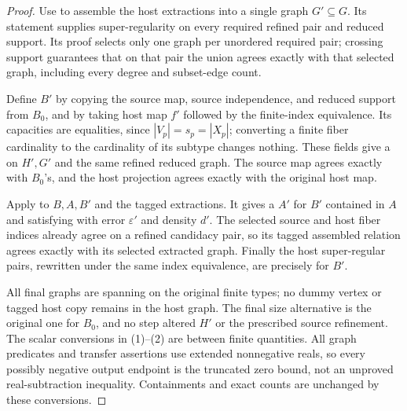 \begin{proof}
Use  to assemble the host
extractions into a single graph $G'\subseteq G$. Its statement
supplies super-regularity on every required refined pair and reduced
support. Its proof selects only one graph per unordered required
pair; crossing support guarantees that on that pair the union
agrees exactly with that selected graph, including every degree
and subset-edge count.

Define $B'$ by copying the source map, source independence, and
reduced support from $B_0$, and by taking host map $f'$ followed by
the finite-index equivalence. Its capacities are equalities, since
$|V_p|=s_p=|X_p|$; converting a finite fiber cardinality to the
cardinality of its subtype changes nothing. These fields give
a  on $H',G'$ and the same refined reduced
graph. The source map agrees exactly with $B_0$'s, and the
host projection agrees exactly with the original host map.

Apply  to $B,A,B'$ and the
tagged extractions. It gives a  $A'$
for $B'$ contained in $A$ and satisfying
 with error $\varepsilon'$ and
density $d'$. The selected source and host fiber indices already
agree on a refined candidacy pair, so its tagged assembled relation
agrees exactly with its selected extracted graph.
Finally the host super-regular pairs, rewritten under the same
index equivalence, are precisely
 for $B'$.

All final graphs are spanning on the original finite types;
no dummy vertex or tagged host copy remains in the host graph.
The final size alternative is the original one for $B_0$,
and no step altered $H'$ or the prescribed source refinement.
The scalar conversions in (1)--(2) are between finite quantities.
All graph predicates and transfer assertions use extended
nonnegative reals, so every possibly negative output endpoint is
the truncated zero bound, not an unproved real-subtraction inequality.
Containments and exact counts are unchanged by these conversions.
\end{proof}
